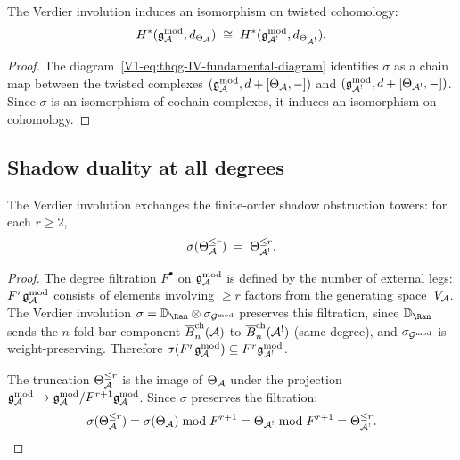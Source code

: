 \begin{corollary}
\label{cor:thqg-IV-twisted-tangent}
The Verdier involution induces an isomorphism on twisted cohomology:
\[
H^*(\mathfrak{g}_{\mathcal{A}}^{\mathrm{mod}}, d_{\Theta_{\mathcal{A}}}) \;\cong\;
H^*(\mathfrak{g}_{\mathcal{A}^!}^{\mathrm{mod}}, d_{\Theta_{\mathcal{A}^!}}).
\]
\end{corollary}

\begin{proof}
The diagram~\eqref{V1-eq:thqg-IV-fundamental-diagram} identifies
$\sigma$ as a chain map between the twisted complexes
$(\mathfrak{g}_{\mathcal{A}}^{\mathrm{mod}}, d + [\Theta_{\mathcal{A}}, -])$ and
$(\mathfrak{g}_{\mathcal{A}^!}^{\mathrm{mod}}, d + [\Theta_{\mathcal{A}^!}, -])$.
Since $\sigma$ is an isomorphism of cochain complexes, it induces an
isomorphism on cohomology.
\end{proof}

%
%

\subsection{Shadow duality at all degrees}

\begin{theorem}
\label{thm:thqg-IV-shadow-duality}
The Verdier involution exchanges the finite-order shadow obstruction towers:
for each $r \geq 2$,
\begin{equation}%
\sigma(\Theta_\cA^{\leq r}) \;=\; \Theta_{\cA^!}^{\leq r}.
\end{equation}
\end{theorem}

\begin{proof}
The degree filtration $F^\bullet$ on $\mathfrak{g}_{\mathcal{A}}^{\mathrm{mod}}$ is defined by the
number of external legs: $F^r\mathfrak{g}_{\mathcal{A}}^{\mathrm{mod}}$ consists of elements involving
$\geq r$ factors from the generating space~$V_{\mathcal{A}}$.
The Verdier involution $\sigma = \VD_{\Ran} \otimes \sigma_{\Gmod}$
preserves this filtration, since $\VD_{\Ran}$ sends the $n$-fold
bar component $\overline{B}_n^{\mathrm{ch}}(\mathcal{A})$ to
$\overline{B}_n^{\mathrm{ch}}(\mathcal{A}^!)$ (same degree), and $\sigma_{\mathcal{G}^{\mathrm{mod}}}$
is weight-preserving. Therefore
$\sigma(F^r\mathfrak{g}_{\mathcal{A}}^{\mathrm{mod}}) \subseteq F^r \mathfrak{g}_{\mathcal{A}^!}^{\mathrm{mod}}$.

The truncation $\Theta_{\mathcal{A}}^{\leq r}$ is the image of $\Theta_{\mathcal{A}}$
under the projection $\mathfrak{g}_{\mathcal{A}}^{\mathrm{mod}} \to \mathfrak{g}_{\mathcal{A}}^{\mathrm{mod}} / F^{r+1}\mathfrak{g}_{\mathcal{A}}^{\mathrm{mod}}$.
Since $\sigma$ preserves the filtration:
\[
\sigma(\Theta_{\mathcal{A}}^{\leq r})
= \sigma(\Theta_{\mathcal{A}}) \bmod F^{r+1}
= \Theta_{\mathcal{A}^!} \bmod F^{r+1}
= \Theta_{\mathcal{A}^!}^{\leq r}.
\qedhere
\]
\end{proof}

